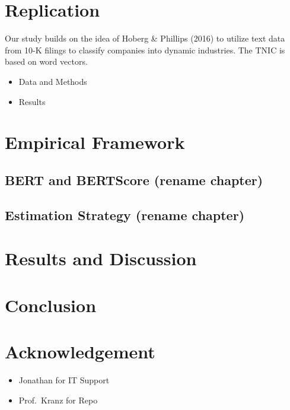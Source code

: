 \documentclass[
]{article}
\providecommand{\tightlist}{%
  \setlength{\itemsep}{0pt}\setlength{\parskip}{0pt}}\usepackage{longtable,booktabs,array}
\begin{document}
\section{Replication}\label{replication}

Our study builds on the idea of Hoberg \& Phillips (2016) to utilize
text data from 10-K filings to classify companies into dynamic
industries. The TNIC is based on word vectors.

\begin{itemize}
\item
  Data and Methods
\item
  Results
\end{itemize}

\section{Empirical Framework}\label{empirical-framework}

\subsection{BERT and BERTScore (rename
chapter)}\label{bert-and-bertscore-rename-chapter}

\subsection{Estimation Strategy (rename
chapter)}\label{estimation-strategy-rename-chapter}

\section{Results and Discussion}\label{results-and-discussion}

\section{Conclusion}\label{conclusion}

\section{Acknowledgement}\label{acknowledgement}

\begin{itemize}
\tightlist
\item
  Jonathan for IT Support
\item
  Prof.~Kranz for Repo
\end{itemize}
\end{document}
